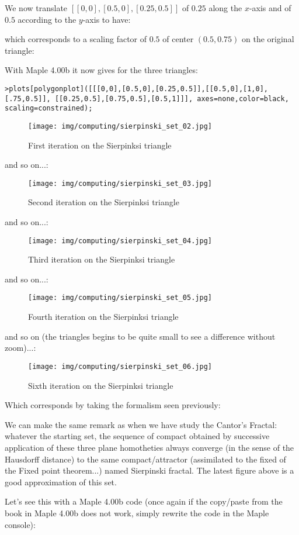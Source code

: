 	We now translate $[[0,0], [0.5,0], [0.25,0.5]]$ of $0.25$ along the $x$-axis and of $0.5$ according to the $y$-axis to have:
	
	which corresponds to a scaling factor of $0.5$ of center $(0.5,0.75)$ on the original triangle:
	
	With Maple 4.00b it now gives for the three triangles:
	
	\texttt{>plots[polygonplot]([[[0,0],[0.5,0],[0.25,0.5]],[[0.5,0],[1,0],[.75,0.5]], [[0.25,0.5],[0.75,0.5],[0.5,1]]], axes=none,color=black, scaling=constrained);}
	\begin{figure}[H]
		\centering
		\texttt{[image: img/computing/sierpinski\_set\_02.jpg]}
		\caption[]{First iteration on the Sierpinksi triangle}
	\end{figure}
	and so on...:
	\begin{figure}[H]
		\centering
		\texttt{[image: img/computing/sierpinski\_set\_03.jpg]}
		\caption[]{Second iteration on the Sierpinksi triangle}
	\end{figure}
	and so on...:
	\begin{figure}[H]
		\centering
		\texttt{[image: img/computing/sierpinski\_set\_04.jpg]}
		\caption[]{Third iteration on the Sierpinksi triangle}
	\end{figure}
	and so on...:
	\begin{figure}[H]
		\centering
		\texttt{[image: img/computing/sierpinski\_set\_05.jpg]}
		\caption[]{Fourth iteration on the Sierpinksi triangle}
	\end{figure}
	and so on (the triangles begins to be quite small to see a difference without zoom)...:
	\begin{figure}[H]
		\centering
		\texttt{[image: img/computing/sierpinski\_set\_06.jpg]}
		\caption[]{Sixth iteration on the Sierpinksi triangle}
	\end{figure}
	Which corresponds by taking the formalism seen previously:
	
	We can make the same remark as when we have study the Cantor's Fractal: whatever the starting set, the sequence of compact obtained by successive application of these three plane homotheties always converge (in the sense of the Hausdorff distance) to the same compact/attractor (assimilated to the fixed of the Fixed point theorem...) named Sierpinski fractal. The latest figure above is a good approximation of this set.
	
	Let's see this with a Maple 4.00b code (once again if the copy/paste from the book in Maple 4.00b does not work, simply rewrite the code in the Maple console):
	
